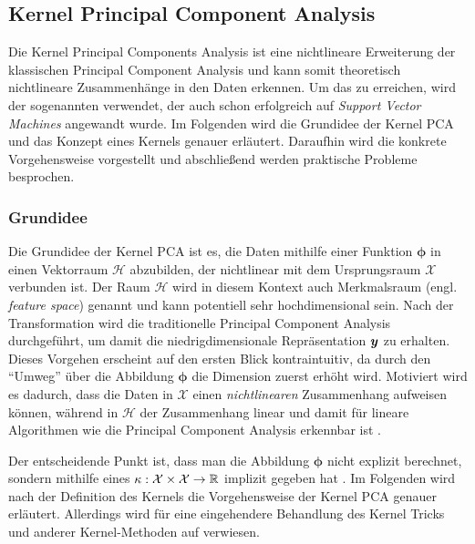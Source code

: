 \subsection{Kernel Principal Component Analysis}
\label{ch:MethodenDerDimRed:statistisch:kPCA}
Die Kernel Principal Components Analysis \parencite{Scholkopf.1997} ist eine nichtlineare Erweiterung der klassischen Principal Component
Analysis und kann somit theoretisch nichtlineare Zusammenhänge in den Daten erkennen. Um das zu
erreichen, wird der sogenannten  verwendet, der auch schon erfolgreich auf
\textit{Support Vector Machines} \parencite{Boser.1992} angewandt wurde. Im Folgenden wird die Grundidee der Kernel PCA und das Konzept
eines Kernels genauer erläutert. Daraufhin wird die konkrete Vorgehensweise vorgestellt und
abschließend werden praktische Probleme besprochen.

\subsubsection{Grundidee}
\label{ch:MethodenDerDimRed:statistisch:kPCA:Grundidee}

Die Grundidee der Kernel PCA ist es, die Daten mithilfe einer Funktion $\bm{\phi}$ in einen
Vektorraum $\mathcal{H}$ abzubilden, der nichtlinear mit dem Ursprungsraum $\mathcal{X}$ verbunden
ist. Der Raum $\mathcal{H}$ wird in diesem Kontext auch Merkmalsraum (engl. \textit{feature space})
genannt und kann potentiell sehr hochdimensional sein. Nach der Transformation wird die
traditionelle Principal Component Analysis durchgeführt, um damit die niedrigdimensionale
Repräsentation $\bm{y}$ zu erhalten. Dieses Vorgehen erscheint auf den ersten Blick
kontraintuitiv, da durch den \enquote{Umweg} über die Abbildung $\bm{\phi}$ die Dimension zuerst
erhöht wird. Motiviert wird es dadurch, dass die Daten in $\mathcal{X}$ einen
\textit{nichtlinearen} Zusammenhang aufweisen können, während in $\mathcal{H}$ der Zusammenhang
linear und damit für lineare Algorithmen wie die Principal Component Analysis erkennbar ist \parencite[vgl.][26]{ShaweTaylor.2011}.

Der entscheidende Punkt ist, dass man die Abbildung $\bm{\phi}$ nicht explizit berechnet, sondern
mithilfe eines  $\kappa: \mathcal{X} \times \mathcal{X} \rightarrow \mathbb{R}$
implizit gegeben hat \parencites[586 -- 588]{Bishop.2006}[583]{Scholkopf.1997}. Im Folgenden wird nach der Definition des
Kernels die Vorgehensweise der Kernel PCA genauer erläutert. Allerdings wird für eine eingehendere
Behandlung des Kernel Tricks und anderer Kernel-Methoden auf \textcite{ShaweTaylor.2011} verwiesen.

